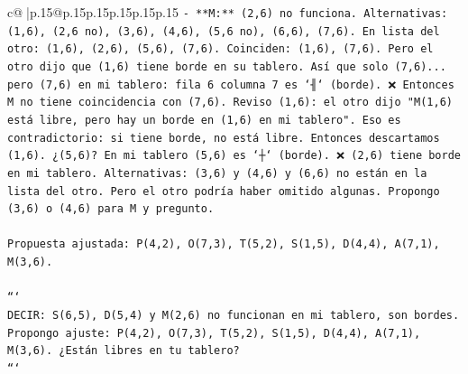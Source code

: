 \documentclass{article}
\begin{document}
{\begin{supertabular}{c@{$\;$}|p{.15\linewidth}@{}p{.15\linewidth}p{.15\linewidth}p{.15\linewidth}p{.15\linewidth}p{.15\linewidth}}
{{{\texttt{{-} **M:** (2,6) no funciona. Alternativas: (1,6), (2,6 no), (3,6), (4,6), (5,6 no), (6,6), (7,6). En lista del otro: (1,6), (2,6), (5,6), (7,6). Coinciden: (1,6), (7,6). Pero el otro dijo que (1,6) tiene borde en su tablero. Así que solo (7,6)... pero (7,6) en mi tablero: fila 6 columna 7 es `╢` (borde). ❌ Entonces M no tiene coincidencia con (7,6). Reviso (1,6): el otro dijo "M(1,6) está libre, pero hay un borde en (1,6) en mi tablero". Eso es contradictorio: si tiene borde, no está libre. Entonces descartamos (1,6). ¿(5,6)? En mi tablero (5,6) es `┼` (borde). ❌ (2,6) tiene borde en mi tablero. Alternativas: (3,6) y (4,6) y (6,6) no están en la lista del otro. Pero el otro podría haber omitido algunas. Propongo (3,6) o (4,6) para M y pregunto.} \\
\\ 
\texttt{Propuesta ajustada: P(4,2), O(7,3), T(5,2), S(1,5), D(4,4), A(7,1), M(3,6).} \\
\\ 
\texttt{```} \\
\texttt{DECIR: S(6,5), D(5,4) y M(2,6) no funcionan en mi tablero, son bordes. Propongo ajuste: P(4,2), O(7,3), T(5,2), S(1,5), D(4,4), A(7,1), M(3,6). ¿Están libres en tu tablero?} \\
\texttt{```} \\
            }
        }
    }
     \\ \\


\end{supertabular}}
\end{document}
